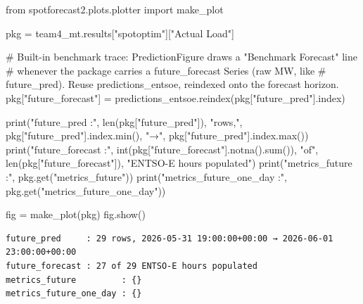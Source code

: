 \documentclass[
  english,
  letterpaper,
]{scrbook}
\newenvironment{Shaded}{\begin{snugshade}}{\end{snugshade}}
\newcommand{\BuiltInTok}[1]{\textcolor[rgb]{0.00,0.23,0.31}{#1}}
\newcommand{\CommentTok}[1]{\textcolor[rgb]{0.37,0.37,0.37}{#1}}
\newcommand{\ImportTok}[1]{\textcolor[rgb]{0.00,0.46,0.62}{#1}}
\newcommand{\NormalTok}[1]{\textcolor[rgb]{0.00,0.23,0.31}{#1}}
\newcommand{\OperatorTok}[1]{\textcolor[rgb]{0.37,0.37,0.37}{#1}}
\newcommand{\StringTok}[1]{\textcolor[rgb]{0.13,0.47,0.30}{#1}}
\begin{document}
\begin{Shaded}
\begin{Highlighting}[]
\ImportTok{from}\NormalTok{ spotforecast2.plots.plotter }\ImportTok{import}\NormalTok{ make\_plot}

\NormalTok{pkg }\OperatorTok{=}\NormalTok{ team4\_mt.results[}\StringTok{"spotoptim"}\NormalTok{][}\StringTok{"Actual Load"}\NormalTok{]}

\CommentTok{\# Built{-}in benchmark trace: PredictionFigure draws a "Benchmark Forecast" line}
\CommentTok{\# whenever the package carries a \textasciigrave{}future\_forecast\textasciigrave{} Series (raw MW, like}
\CommentTok{\# \textasciigrave{}future\_pred\textasciigrave{}). Reuse predictions\_entsoe, reindexed onto the forecast horizon.}
\NormalTok{pkg[}\StringTok{"future\_forecast"}\NormalTok{] }\OperatorTok{=}\NormalTok{ predictions\_entsoe.reindex(pkg[}\StringTok{"future\_pred"}\NormalTok{].index)}

\BuiltInTok{print}\NormalTok{(}\StringTok{"future\_pred     :"}\NormalTok{, }\BuiltInTok{len}\NormalTok{(pkg[}\StringTok{"future\_pred"}\NormalTok{]), }\StringTok{"rows,"}\NormalTok{,}
\NormalTok{      pkg[}\StringTok{"future\_pred"}\NormalTok{].index.}\BuiltInTok{min}\NormalTok{(), }\StringTok{"→"}\NormalTok{, pkg[}\StringTok{"future\_pred"}\NormalTok{].index.}\BuiltInTok{max}\NormalTok{())}
\BuiltInTok{print}\NormalTok{(}\StringTok{"future\_forecast :"}\NormalTok{, }\BuiltInTok{int}\NormalTok{(pkg[}\StringTok{"future\_forecast"}\NormalTok{].notna().}\BuiltInTok{sum}\NormalTok{()),}
      \StringTok{"of"}\NormalTok{, }\BuiltInTok{len}\NormalTok{(pkg[}\StringTok{"future\_forecast"}\NormalTok{]), }\StringTok{"ENTSO{-}E hours populated"}\NormalTok{)}
\BuiltInTok{print}\NormalTok{(}\StringTok{"metrics\_future         :"}\NormalTok{, pkg.get(}\StringTok{"metrics\_future"}\NormalTok{))}
\BuiltInTok{print}\NormalTok{(}\StringTok{"metrics\_future\_one\_day :"}\NormalTok{, pkg.get(}\StringTok{"metrics\_future\_one\_day"}\NormalTok{))}

\NormalTok{fig }\OperatorTok{=}\NormalTok{ make\_plot(pkg)}
\NormalTok{fig.show()}
\end{Highlighting}
\end{Shaded}

\begin{verbatim}
future_pred     : 29 rows, 2026-05-31 19:00:00+00:00 → 2026-06-01 23:00:00+00:00
future_forecast : 27 of 29 ENTSO-E hours populated
metrics_future         : {}
metrics_future_one_day : {}
\end{verbatim}
\end{document}
